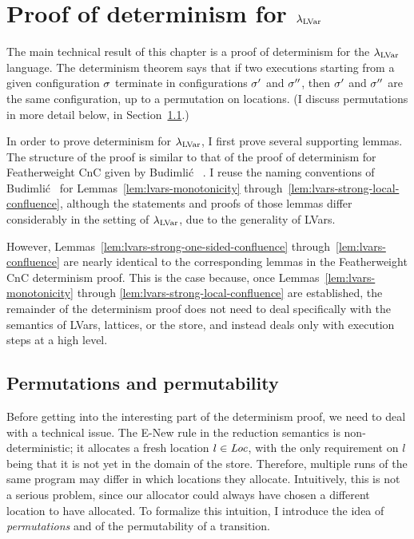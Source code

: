 \section{Proof of determinism for
  $\lambda_{\textrm{LVar}}$}\label{s:lvars-proof}

The main technical result of this chapter is a proof of determinism
for the $\lambda_{\textrm{LVar}}$ language.  The determinism theorem says that if
two executions starting from a given configuration $\sigma$ terminate
in configurations $\sigma'$ and $\sigma''$, then $\sigma'$ and $\sigma''$
are the same configuration, up to a permutation on locations.  (I
discuss permutations in more detail below, in
Section~\ref{subsection:lvars-permutations}.)

In order to prove determinism for $\lambda_{\textrm{LVar}}$, I first prove several
supporting lemmas.  The structure of the proof is similar to that of
the proof of determinism for Featherweight CnC given by Budimli\'c
\etal~\cite{CnC}.  I reuse the naming conventions of Budimli\'c
\etal~for Lemmas~\ref{lem:lvars-monotonicity}
through~\ref{lem:lvars-strong-local-confluence}, although the
statements and proofs of those lemmas differ considerably in the
setting of $\lambda_{\textrm{LVar}}$, due to the generality of LVars.

However, Lemmas~\ref{lem:lvars-strong-one-sided-confluence}
through~\ref{lem:lvars-confluence} are nearly identical to the
corresponding lemmas in the Featherweight CnC determinism proof.  This
is the case because, once Lemmas~\ref{lem:lvars-monotonicity} through
\ref{lem:lvars-strong-local-confluence} are established, the remainder
of the determinism proof does not need to deal specifically with the
semantics of LVars, lattices, or the store, and instead deals only
with execution steps at a high level.


\subsection{Permutations and permutability}\label{subsection:lvars-permutations}


Before getting into the interesting part of the determinism proof, we
need to deal with a technical issue.  The {\sc E-New} rule in the
reduction semantics is non-deterministic; it allocates a fresh
location $l \in \mathit{Loc}$, with the only requirement on $l$ being that it
is not yet in the domain of the store.  Therefore, multiple runs of
the same program may differ in which locations they allocate.
Intuitively, this is not a serious problem, since our allocator could
always have chosen a different location to have allocated.  To
formalize this intuition, I introduce the idea of \emph{permutations}
and of the permutability of a transition.


